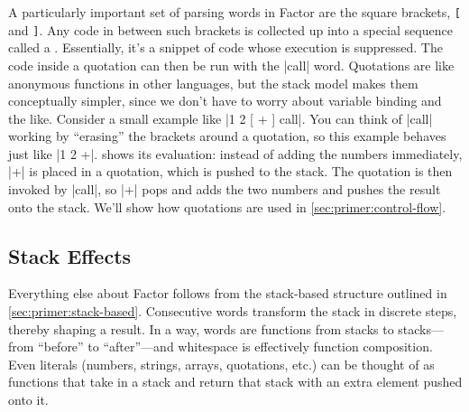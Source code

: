 


A particularly important set of parsing words in Factor are the square
brackets, \Verb|[| and \Verb|]|.  Any code in between such brackets is
collected up into a special sequence called a .  Essentially,
it's a snippet of code whose execution is suppressed.  The code inside a
quotation can then be run with the \factor|call| word.  Quotations are like
anonymous functions in other languages, but the stack model makes them
conceptually simpler, since we don't have to worry about variable binding and
the like.  Consider a small example like \factor|1 2 [ + ] call|.  You can
think of \factor|call| working by ``erasing'' the brackets around a quotation,
so this example behaves just like \factor|1 2 +|.   shows its
evaluation: instead of adding the numbers immediately, \factor|+| is placed in
a quotation, which is pushed to the stack.  The quotation is then invoked by
\factor|call|, so \factor|+| pops and adds the two numbers and pushes the
result onto the stack.  We'll show how quotations are used in
\cref{sec:primer:control-flow}.

\subsection{Stack Effects}

Everything else about Factor follows from the stack-based structure outlined in
\cref{sec:primer:stack-based}.  Consecutive words transform the stack in
discrete steps, thereby shaping a result.  In a way, words are functions from
stacks to stacks---from ``before'' to ``after''---and whitespace is effectively
function composition.  Even literals (numbers, strings, arrays, quotations,
etc.) can be thought of as functions that take in a stack and return that stack
with an extra element pushed onto it.

